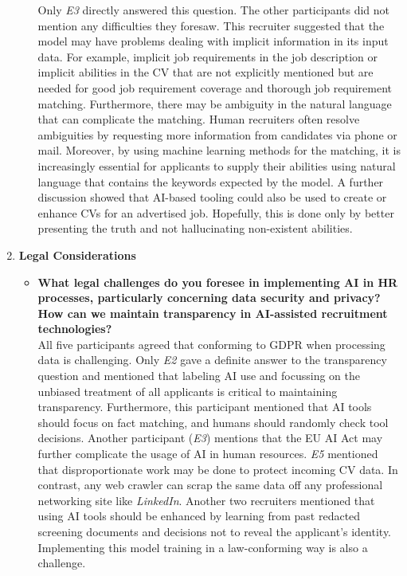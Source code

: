 \documentclass[draft,final]{thesisclass} %
\begin{document}
\begin{enumerate}
\begin{itemize}
        Only \textit{E3} directly answered this question. The other participants did not mention any difficulties they foresaw.
        This recruiter suggested that the model may have problems dealing with implicit information in its input data. For example, implicit job requirements in the job description or implicit abilities in the \acs{CV} that are not explicitly mentioned but are needed for good job requirement coverage and thorough job requirement matching. Furthermore, there may be ambiguity in the natural language that can complicate the matching.
        Human recruiters often resolve ambiguities by requesting more information from candidates via phone or mail.
        Moreover, by using machine learning methods for the matching, it is increasingly essential for applicants to supply their abilities using natural language that contains the keywords expected by the model. A further discussion showed that \acs{AI}-based tooling could also be used to create or enhance \acs{CV}s for an advertised job.
        Hopefully, this is done only by better presenting the truth and not hallucinating non-existent abilities.
    \end{itemize}
    \item \textbf{Legal Considerations}
    \begin{itemize}
        \item \textbf{What legal challenges do you foresee in implementing \acs{AI} in \acs{HR} processes, particularly concerning data security and privacy? How can we maintain transparency in \acs{AI}-assisted recruitment technologies?}\\
        All five participants agreed that conforming to \acs{GDPR} when processing data is challenging. Only \textit{E2} gave a definite answer to the transparency question and mentioned that labeling \acs{AI} use and focussing on the unbiased treatment of all applicants is critical to maintaining transparency. Furthermore, this participant mentioned that \acs{AI} tools should focus on fact matching, and humans should randomly check tool decisions. Another participant (\textit{E3}) mentions that the \acs{EU AI Act} may further complicate the usage of \acs{AI} in human resources. \textit{E5} mentioned that disproportionate work may be done to protect incoming \acs{CV} data. In contrast, any web crawler can scrap the same data off any professional networking site like \textit{LinkedIn}.
        Another two recruiters mentioned that using \acs{AI} tools should be enhanced by learning from past redacted screening documents and decisions not to reveal the applicant's identity. Implementing this model training in a law-conforming way is also a challenge.

\end{itemize}
\end{enumerate}
\end{document}
